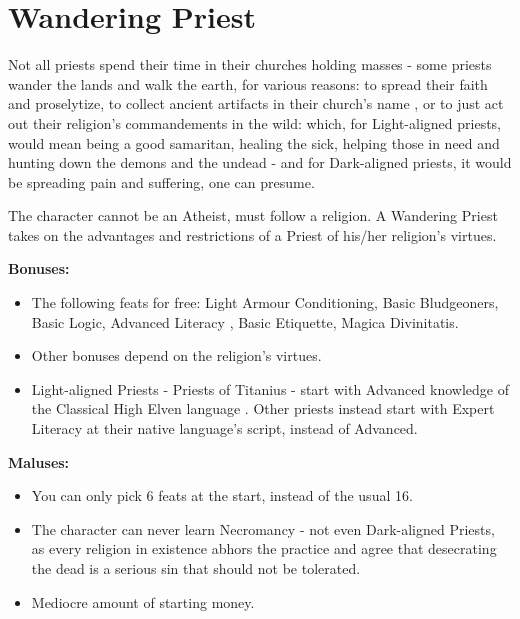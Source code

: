 \section{Wandering Priest}
Not all priests spend their time in their churches holding masses - some priests wander the lands and walk the earth, for various reasons: to spread their faith and proselytize, to collect ancient artifacts in their church's name , or to just act out their religion's commandements in the wild: which, for Light-aligned priests, would mean being a good samaritan, healing the sick, helping those in need and hunting down the demons and the undead - and for Dark-aligned priests, it would be spreading pain and suffering, one can presume. 

The character cannot be an Atheist, must follow a religion. A Wandering Priest takes on the advantages and restrictions of a Priest of his/her religion's virtues.

\textbf{Bonuses:}
\begin{itemize}
	\item The following feats for free: Light Armour Conditioning, Basic Bludgeoners, Basic Logic, Advanced Literacy , Basic Etiquette, Magica Divinitatis.
	\item Other bonuses depend on the religion's virtues.
	\item Light-aligned Priests - Priests of Titanius - start with Advanced knowledge of the Classical High Elven language . Other priests instead start with Expert Literacy at their native language's script, instead of Advanced.
\end{itemize}


\textbf{Maluses:}
\begin{itemize}
	\item You can only pick 6 feats at the start, instead of the usual 16.
	\item The character can never learn Necromancy - not even Dark-aligned Priests, as every religion in existence  abhors the practice and agree that desecrating the dead is a serious sin that should not be tolerated.
	\item Mediocre amount of starting money.
\end{itemize}
